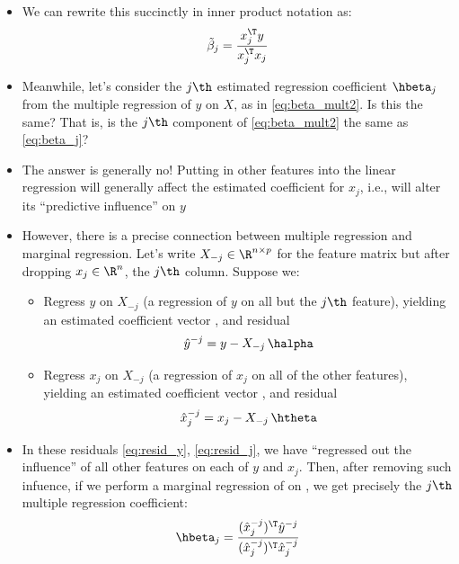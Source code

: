 \documentclass{article}
\begin{document}
\begin{itemize}
\item We can rewrite this succinctly in inner product notation as:
  \begin{equation}
  \label{eq:beta_j}
  \tilde\beta_j = \frac{x_j^\T y}{x_j^\T x_j}
  \end{equation}

\item Meanwhile, let's consider the $j\th$ estimated regression coefficient
  $\hbeta_j$ from the multiple regression of $y$ on $X$, as in
  \eqref{eq:beta_mult2}. Is this the same? That is, is the $j\th$ component of
  \eqref{eq:beta_mult2} the same as \eqref{eq:beta_j}? 

\item The answer is generally no! Putting in other features into the linear
  regression will generally affect the estimated coefficient for $x_j$, i.e.,
  will alter its ``predictive influence'' on $y$

\item However, there is a precise connection between multiple regression and
  marginal regression. Let's write $X_{-j} \in \R^{n \times p}$ for the feature
  matrix but after dropping $x_j \in \R^n$, the $j\th$ column. Suppose we:  
  \begin{itemize}
  \item Regress $y$ on $X_{-j}$ (a regression of $y$ on all but the $j\th$
    feature), yielding an estimated coefficient vector , and residual  
    \begin{equation}
    \label{eq:resid_y}
    \hat{y}^{-j} = y - X_{-j} \, \halpha 
    \end{equation}

  \item Regress $x_j$ on $X_{-j}$ (a regression of $x_j$ on all of the other
    features), yielding an estimated coefficient vector , and residual  
    \begin{equation}
    \label{eq:resid_j}
    \hat{x}^{-j}_j = x_j - X_{-j} \, \htheta 
    \end{equation}
  \end{itemize}

\item In these residuals \eqref{eq:resid_y}, \eqref{eq:resid_j}, we have
  ``regressed out the influence'' of all other features on each of $y$ and
  $x_j$. Then, after removing such infuence, if we perform a marginal regression
  of  on , we get precisely the
  $j\th$ multiple regression coefficient: 
  \begin{equation}
  \label{eq:beta_j_mult}
  \hbeta_j = \frac{(\hat{x}^{-j}_j)^\T\hat{y}^{-j}}
  {(\hat{x}^{-j}_j)^\T\hat{x}^{-j}_j} 
  \end{equation}


\end{itemize}
\end{document}
